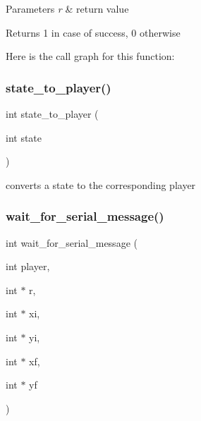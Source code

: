 \begin{DoxyParams}{Parameters}
{\em r} & return value \\
\hline
\end{DoxyParams}
\begin{DoxyReturn}{Returns}
1 in case of success, 0 otherwise 
\end{DoxyReturn}
Here is the call graph for this function\+:
\hypertarget{group___checkers_gad7f7feb83c536c88d67834e7e20780ee}{}\label{group___checkers_gad7f7feb83c536c88d67834e7e20780ee} 
\subsubsection{\texorpdfstring{state\+\_\+to\+\_\+player()}{state\_to\_player()}}
{\footnotesize\ttfamily int state\+\_\+to\+\_\+player (\begin{DoxyParamCaption}\item[{int}]{state }\end{DoxyParamCaption})}



converts a state to the corresponding player 

\hypertarget{group___checkers_ga17180b891d06475062d87e08d01af278}{}\label{group___checkers_ga17180b891d06475062d87e08d01af278} 
\subsubsection{\texorpdfstring{wait\+\_\+for\+\_\+serial\+\_\+message()}{wait\_for\_serial\_message()}}
{\footnotesize\ttfamily int wait\+\_\+for\+\_\+serial\+\_\+message (\begin{DoxyParamCaption}\item[{int}]{player,  }\item[{int $\ast$}]{r,  }\item[{int $\ast$}]{xi,  }\item[{int $\ast$}]{yi,  }\item[{int $\ast$}]{xf,  }\item[{int $\ast$}]{yf }\end{DoxyParamCaption})}



